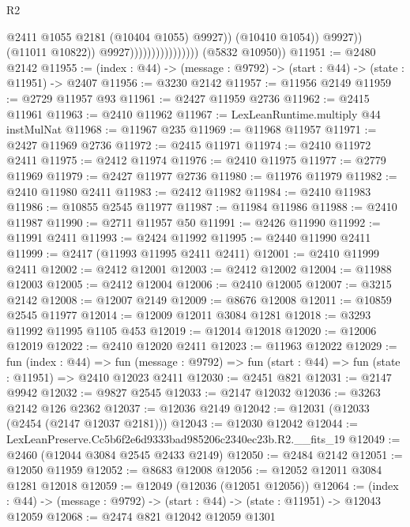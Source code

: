 \begin{lexlean}{R2}
\begin{coremodule}
                                                  @2411
                                                  @1055
                                                  @2181
                                                  (@10404 @1055)
                                                  @9927))
                                              (@10410 @1054))
                                            @9927))
                                        (@11011 @10822))
                                      @9927))))))))))))))))
      (@5832 @10950))
@11951 := @2480 @2142
@11955 := (index : @44) -> (message : @9792) -> (start : @44) -> (state : @11951) -> @2407
@11956 := @3230 @2142
@11957 := @11956 @2149
@11959 := @2729 @11957 @93
@11961 := @2427 @11959 @2736
@11962 := @2415 @11961
@11963 := @2410 @11962
@11967 := LexLeanRuntime.multiply @44 instMulNat
@11968 := @11967 @235
@11969 := @11968 @11957
@11971 := @2427 @11969 @2736
@11972 := @2415 @11971
@11974 := @2410 @11972 @2411
@11975 := @2412 @11974
@11976 := @2410 @11975
@11977 := @2779 @11969
@11979 := @2427 @11977 @2736
@11980 := @11976 @11979
@11982 := @2410 @11980 @2411
@11983 := @2412 @11982
@11984 := @2410 @11983
@11986 := @10855 @2545 @11977
@11987 := @11984 @11986
@11988 := @2410 @11987
@11990 := @2711 @11957 @50
@11991 := @2426 @11990
@11992 := @11991 @2411
@11993 := @2424 @11992
@11995 := @2440 @11990 @2411
@11999 := @2417 (@11993 @11995 @2411 @2411)
@12001 := @2410 @11999 @2411
@12002 := @2412 @12001
@12003 := @2412 @12002
@12004 := @11988 @12003
@12005 := @2412 @12004
@12006 := @2410 @12005
@12007 := @3215 @2142
@12008 := @12007 @2149
@12009 := @8676 @12008
@12011 := @10859 @2545 @11977
@12014 := @12009 @12011 @3084 @1281
@12018 := @3293 @11992 @11995 @1105 @453
@12019 := @12014 @12018
@12020 := @12006 @12019
@12022 := @2410 @12020 @2411
@12023 := @11963 @12022
@12029 := fun (index : @44) =>
  fun (message : @9792) => fun (start : @44) => fun (state : @11951) => @2410 @12023 @2411
@12030 := @2451 @821
@12031 := @2147 @9942
@12032 := @9827 @2545
@12033 := @2147 @12032
@12036 := @3263 @2142 @126 @2362
@12037 := @12036 @2149
@12042 := @12031 (@12033 (@2454 (@2147 @12037 @2181)))
@12043 := @12030 @12042
@12044 := LexLeanPreserve.Cc5b6f2e6d9333bad985206c2340ec23b.R2.__fits_19
@12049 := @2460 (@12044 @3084 @2545 @2433 @2149)
@12050 := @2484 @2142
@12051 := @12050 @11959
@12052 := @8683 @12008
@12056 := @12052 @12011 @3084 @1281 @12018
@12059 := @12049 (@12036 (@12051 @12056))
@12064 := (index : @44) -> (message : @9792) -> (start : @44) -> (state : @11951) -> @12043 @12059
@12068 := @2474 @821 @12042 @12059 @1301

\end{coremodule}
\end{lexlean}
